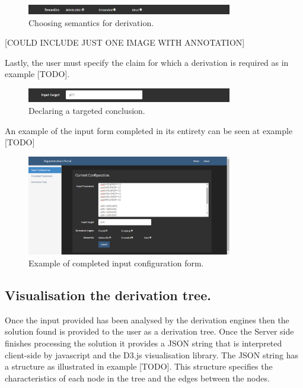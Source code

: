\begin{figure}[h]
    \centering
    \includegraphics[width=0.8\textwidth]{argumentationSemantics.png}
    \caption{Choosing semantics for derivation.}
    \label{fig:arg_semantics}
\end{figure}

[COULD INCLUDE JUST ONE IMAGE WITH ANNOTATION]

Lastly, the user must specify the claim for which a derivation is required as in example [TODO].

\begin{figure}[h]
    \centering
    \includegraphics[width=0.8\textwidth]{argumentationConclusion.png}
    \caption{Declaring a targeted conclusion.}
    \label{fig:arg_conclusion}
\end{figure}

An example of the input form completed in its entirety can be seen at example [TODO]

\begin{figure}[h]
    \centering
    \includegraphics[width=0.8\textwidth]{argumentationInputFull.png}
    \caption{Example of completed input configuration form.}
    \label{fig:arg_input_full}
\end{figure}

\subsection{Visualisation the derivation tree.}

Once the input provided has been analysed by the derivation engines then the solution found is provided to the user as a derivation tree. Once the Server side finishes processing the solution it provides a JSON string that is interpreted client-side by javascript and the D3.js visualisation library. The JSON string has a structure as illustrated in example [TODO]. This structure specifies the characteristics of each node in the tree and the edges between the nodes.

